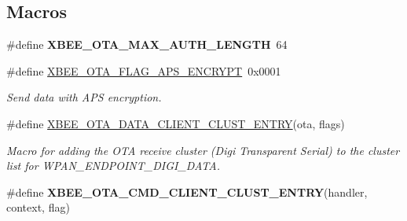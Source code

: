 \subsection*{Macros}
\begin{DoxyCompactItemize}
\item 
\mbox{\label{group__xbee__ota__client_gabdc98be69226a7bbd2eb8dc231948688}} 
\#define {\bfseries X\+B\+E\+E\+\_\+\+O\+T\+A\+\_\+\+M\+A\+X\+\_\+\+A\+U\+T\+H\+\_\+\+L\+E\+N\+G\+TH}~64
\item 
\mbox{\label{group__xbee__ota__client_ga2febaa0d599fc4f6fd94fbcf232f8d09}} 
\#define \hyperlink{group__xbee__ota__client_ga2febaa0d599fc4f6fd94fbcf232f8d09}{X\+B\+E\+E\+\_\+\+O\+T\+A\+\_\+\+F\+L\+A\+G\+\_\+\+A\+P\+S\+\_\+\+E\+N\+C\+R\+Y\+PT}~0x0001
\begin{DoxyCompactList}\small\item\em Send data with A\+PS encryption. \end{DoxyCompactList}\item 
\#define \hyperlink{group__xbee__ota__client_ga35fda0f9b1d07269c75d0407f3b26425}{X\+B\+E\+E\+\_\+\+O\+T\+A\+\_\+\+D\+A\+T\+A\+\_\+\+C\+L\+I\+E\+N\+T\+\_\+\+C\+L\+U\+S\+T\+\_\+\+E\+N\+T\+RY}(ota,  flags)
\begin{DoxyCompactList}\small\item\em Macro for adding the O\+TA receive cluster (Digi Transparent Serial) to the cluster list for W\+P\+A\+N\+\_\+\+E\+N\+D\+P\+O\+I\+N\+T\+\_\+\+D\+I\+G\+I\+\_\+\+D\+A\+TA. \end{DoxyCompactList}\item 
\#define {\bfseries X\+B\+E\+E\+\_\+\+O\+T\+A\+\_\+\+C\+M\+D\+\_\+\+C\+L\+I\+E\+N\+T\+\_\+\+C\+L\+U\+S\+T\+\_\+\+E\+N\+T\+RY}(handler,  context,  flag)
\end{DoxyCompactItemize}

